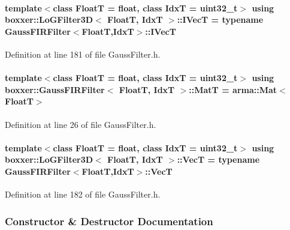 \paragraph[{\texorpdfstring{I\+VecT}{IVecT}}]{\setlength{\rightskip}{0pt plus 5cm}template$<$class FloatT  = float, class IdxT  = uint32\+\_\+t$>$ using {\bf boxxer\+::\+Lo\+G\+Filter3D}$<$ FloatT, IdxT $>$\+::{\bf I\+VecT} =  typename {\bf Gauss\+F\+I\+R\+Filter}$<$FloatT,IdxT$>$\+::{\bf I\+VecT}}\hypertarget{classboxxer_1_1LoGFilter3D_a7471a6baf4e07f70d6ba8100bf90b1a2}{}\label{classboxxer_1_1LoGFilter3D_a7471a6baf4e07f70d6ba8100bf90b1a2}


Definition at line 181 of file Gauss\+Filter.\+h.

\paragraph[{\texorpdfstring{MatT}{MatT}}]{\setlength{\rightskip}{0pt plus 5cm}template$<$class FloatT = float, class IdxT = uint32\+\_\+t$>$ using {\bf boxxer\+::\+Gauss\+F\+I\+R\+Filter}$<$ FloatT, IdxT $>$\+::{\bf MatT} =  arma\+::\+Mat$<$FloatT$>$\hspace{0.3cm}{\ttfamily [inherited]}}\hypertarget{classboxxer_1_1GaussFIRFilter_a83cf4c7f4782f69918c0e0883fff5412}{}\label{classboxxer_1_1GaussFIRFilter_a83cf4c7f4782f69918c0e0883fff5412}


Definition at line 26 of file Gauss\+Filter.\+h.

\paragraph[{\texorpdfstring{VecT}{VecT}}]{\setlength{\rightskip}{0pt plus 5cm}template$<$class FloatT  = float, class IdxT  = uint32\+\_\+t$>$ using {\bf boxxer\+::\+Lo\+G\+Filter3D}$<$ FloatT, IdxT $>$\+::{\bf VecT} =  typename {\bf Gauss\+F\+I\+R\+Filter}$<$FloatT,IdxT$>$\+::{\bf VecT}}\hypertarget{classboxxer_1_1LoGFilter3D_ad4ce9fa2ad4134b954162e2597fb6a48}{}\label{classboxxer_1_1LoGFilter3D_ad4ce9fa2ad4134b954162e2597fb6a48}


Definition at line 182 of file Gauss\+Filter.\+h.



\subsubsection{Constructor \& Destructor Documentation}

